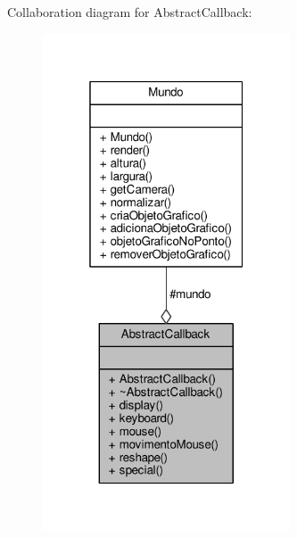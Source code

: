 Collaboration diagram for Abstract\+Callback\+:
\nopagebreak
\begin{figure}[H]
\begin{center}
\leavevmode
\includegraphics[width=208pt]{classAbstractCallback__coll__graph}
\end{center}
\end{figure}
